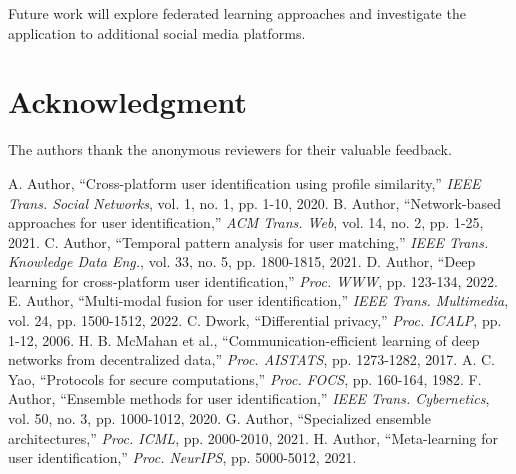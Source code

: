 \documentclass[conference]{IEEEtran}
\begin{document}
Future work will explore federated learning approaches and investigate the application to additional social media platforms.

\section*{Acknowledgment}
The authors thank the anonymous reviewers for their valuable feedback.

\begin{thebibliography}{00}
 A. Author, ``Cross-platform user identification using profile similarity,'' \emph{IEEE Trans. Social Networks}, vol. 1, no. 1, pp. 1-10, 2020.
 B. Author, ``Network-based approaches for user identification,'' \emph{ACM Trans. Web}, vol. 14, no. 2, pp. 1-25, 2021.
 C. Author, ``Temporal pattern analysis for user matching,'' \emph{IEEE Trans. Knowledge Data Eng.}, vol. 33, no. 5, pp. 1800-1815, 2021.
 D. Author, ``Deep learning for cross-platform user identification,'' \emph{Proc. WWW}, pp. 123-134, 2022.
 E. Author, ``Multi-modal fusion for user identification,'' \emph{IEEE Trans. Multimedia}, vol. 24, pp. 1500-1512, 2022.
 C. Dwork, ``Differential privacy,'' \emph{Proc. ICALP}, pp. 1-12, 2006.
 H. B. McMahan et al., ``Communication-efficient learning of deep networks from decentralized data,'' \emph{Proc. AISTATS}, pp. 1273-1282, 2017.
 A. C. Yao, ``Protocols for secure computations,'' \emph{Proc. FOCS}, pp. 160-164, 1982.
 F. Author, ``Ensemble methods for user identification,'' \emph{IEEE Trans. Cybernetics}, vol. 50, no. 3, pp. 1000-1012, 2020.
 G. Author, ``Specialized ensemble architectures,'' \emph{Proc. ICML}, pp. 2000-2010, 2021.
 H. Author, ``Meta-learning for user identification,'' \emph{Proc. NeurIPS}, pp. 5000-5012, 2021.
\end{thebibliography}
\end{document}

